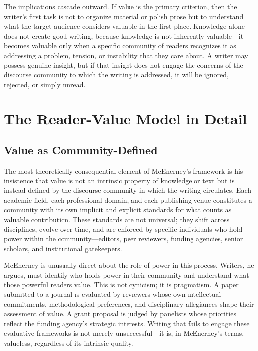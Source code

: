 \documentclass[12pt]{article}
\begin{document}
The implications cascade outward. If value is the primary criterion, then the writer's first task is not to organize material or polish prose but to understand what the target audience considers valuable in the first place. Knowledge alone does not create good writing, because knowledge is not inherently valuable---it becomes valuable only when a specific community of readers recognizes it as addressing a problem, tension, or instability that they care about. A writer may possess genuine insight, but if that insight does not engage the concerns of the discourse community to which the writing is addressed, it will be ignored, rejected, or simply unread.

\section*{The Reader-Value Model in Detail}

\subsection*{Value as Community-Defined}

The most theoretically consequential element of McEnerney's framework is his insistence that value is not an intrinsic property of knowledge or text but is instead defined by the discourse community in which the writing circulates. Each academic field, each professional domain, and each publishing venue constitutes a community with its own implicit and explicit standards for what counts as valuable contribution. These standards are not universal; they shift across disciplines, evolve over time, and are enforced by specific individuals who hold power within the community---editors, peer reviewers, funding agencies, senior scholars, and institutional gatekeepers.

McEnerney is unusually direct about the role of power in this process. Writers, he argues, must identify who holds power in their community and understand what those powerful readers value. This is not cynicism; it is pragmatism. A paper submitted to a journal is evaluated by reviewers whose own intellectual commitments, methodological preferences, and disciplinary allegiances shape their assessment of value. A grant proposal is judged by panelists whose priorities reflect the funding agency's strategic interests. Writing that fails to engage these evaluative frameworks is not merely unsuccessful---it is, in McEnerney's terms, valueless, regardless of its intrinsic quality.
\end{document}
